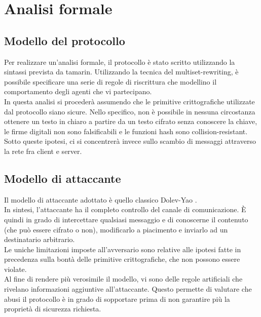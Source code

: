 \section{Analisi formale}

\subsection{Modello del protocollo}
Per realizzare un'analisi formale, il protocollo è stato scritto utilizzando la sintassi prevista da \gls{tamarin}.
Utilizzando la tecnica del \gls{multiset-rewriting}, è possibile specificare una serie di regole di riscrittura
che modellino il comportamento degli agenti che vi partecipano. \\

In questa analisi si procederà assumendo che le primitive crittografiche utilizzate dal protocollo siano sicure.
Nello specifico, non è possibile in nessuna circostanza ottenere un testo in chiaro a partire da un testo cifrato senza conoscere la chiave,
le firme digitali non sono falsificabili e le funzioni hash sono collision-resistant. \\

Sotto queste ipotesi, ci si concentrerà invece sullo scambio di messaggi attraverso la rete fra client e server.

\subsection{Modello di attaccante}
Il modello di attaccante adottato è quello classico Dolev-Yao \cite{art:dolev-yao}. \\
In sintesi, l'attaccante ha il completo controllo del canale di comunicazione.
È quindi in grado di intercettare qualsiasi messaggio e di conoscerne il contenuto (che può essere cifrato o non),
modificarlo a piacimento e inviarlo ad un destinatario arbitrario. \\
Le uniche limitazioni imposte all'avversario sono relative alle ipotesi fatte in precedenza
sulla bontà delle primitive crittografiche, che non possono essere violate. \\

Al fine di rendere più verosimile il modello, vi sono delle regole artificiali che rivelano informazioni aggiuntive all'attaccante.
Questo permette di valutare che abusi il protocollo è in grado di sopportare prima di non garantire più la proprietà di sicurezza richiesta.

